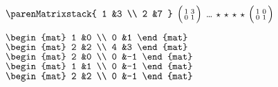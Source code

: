 \documentclass{book}
\begin{document}
\stopmpxshipout
\mpxshipout%
{\tiny       $\parenMatrixstack{
                                1  &3  \\
                                2  &7
                              }$}%
\stopmpxshipout
\mpxshipout%
{\tiny       $\Bigl(\begin{smallmatrix}
                                1  &3  \\
                                0  &1
                              \end{smallmatrix}\Bigr)$}%
\stopmpxshipout
\mpxshipout%
{\small \ldots}%
\stopmpxshipout
\mpxshipout%
{\small $\star$}%
\stopmpxshipout
\mpxshipout%
{\small $\star$}%
\stopmpxshipout
\mpxshipout%
{\small $\star$}%
\stopmpxshipout
\mpxshipout%
{\small $\star$}%
\stopmpxshipout
\mpxshipout%
{\tiny $\Bigl(\begin{smallmatrix}
                                1  &0  \\
                                0  &1
                              \end{smallmatrix}\Bigr)$}%
\stopmpxshipout
\mpxshipout%
\strut{\small $\displaystyle
                 \begin{mat}
		   1  &0  \\
		   0  &1 
		 \end{mat}$}%
\stopmpxshipout
\mpxshipout%
{\small $\displaystyle
                 \begin{mat}
		   2  &2  \\
		   4  &3 
		 \end{mat}$}%
\stopmpxshipout
\mpxshipout%
{\small $\displaystyle
                 \begin{mat}
		   2  &0  \\
		   0  &-1
		 \end{mat}$}%
\stopmpxshipout
\mpxshipout%
{\small $\displaystyle
                 \begin{mat}
		   1  &1  \\
		   0  &-1
		 \end{mat}$}%
\stopmpxshipout
\mpxshipout%
{\small $\displaystyle
                 \begin{mat}
		   2  &2  \\
		   0  &-1
		 \end{mat}$}%
\stopmpxshipout
\mpxshipout%
\end{document}
